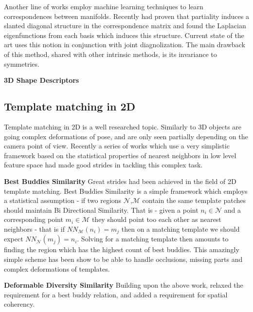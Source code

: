 \documentclass[10pt,twocolumn,letterpaper]{article}
\begin{document}
Another line of works employ machine learning techniques to learn correspondences between manifolds. 
Recently \cite{rodola2017partial} had proven that partiality induces a slanted diagonal structure in the correspondence matrix and found the Laplacian eigenfunctions from each basis which induces this structure. Current state of the art\cite{litany2017fully} uses this notion in conjunction with joint diagnolization. The main drawback of this method, shared with other intrinsic methods, is its invariance to symmetries. 

\textbf{3D Shape Descriptors} 


\subsection{Template matching in 2D}
Template matching in 2D is a well researched topic. Similarly to 3D objects are going complex deformations of pose, and are only seen partially depending on the camera point of view. Recently a series of works which use a very simplistic framework based on the statistical properties of nearest neighbors in low level feature space had made good strides in tackling this complex task.

\textbf{Best Buddies Similarity}
Great strides had been achieved in the field of 2D template matching. Best Buddies Similarity\cite{dekel2015best} is a simple framework which employs a statistical assumption - if two regions $\mathcal{N}$,$\mathcal{M}$ contain the same template patches should maintain Bi Directional Similarity. 
That is - given a point $n_i\in\mathcal{N}$ and a corresponding point $m_i\in\mathcal{M}$ they should point too each other as nearest neighbors - that is if $NN_{\mathcal{M}}(n_i)=m_j$ then on a matching template we should expect $NN_{\mathcal{N}}(m_j)=n_i$. Solving for a matching template then amounts to finding the region which has the highest count of best buddies. This amazingly simple scheme has been show to be able to handle occlusions, missing parts and complex deformations of templates.

\textbf{Deformable Diversity Similarity}
Building upon the above work, \cite{talmi2017template}  relaxed the requirement for a best buddy relation, and added a requirement for spatial coherency.
\end{document}
